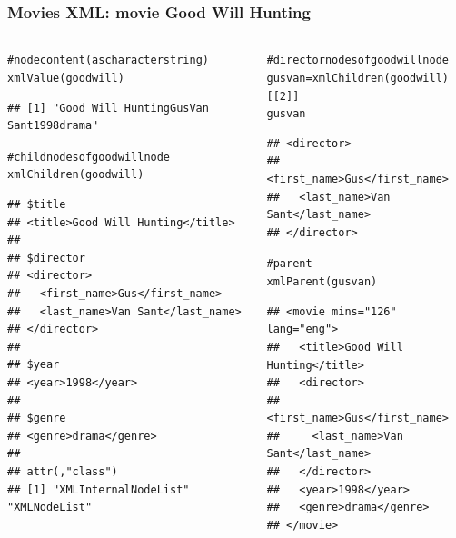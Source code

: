 \documentclass{beamer}\usepackage[]{graphicx}\usepackage[]{color}
\makeatletter
\newcommand{\hlnum}[1]{\textcolor[rgb]{0.063,0.58,0.627}{#1}}%
\newcommand{\hlcom}[1]{\textcolor[rgb]{0.588,0.588,0.588}{#1}}%
\newcommand{\hlstd}[1]{\textcolor[rgb]{0.196,0.196,0.196}{#1}}%
\newcommand{\hlkwb}[1]{\textcolor[rgb]{0.627,0,0.314}{#1}}%
\newcommand{\hlkwd}[1]{\textcolor[rgb]{0.78,0.227,0.412}{#1}}%
\newenvironment{kframe}{%
 \def\at@end@of@kframe{}%
 \ifinner\ifhmode%
  \def\at@end@of@kframe{\end{minipage}}%
  \begin{minipage}{\columnwidth}%
 \fi\fi%
 \def\FrameCommand##1{\hskip\@totalleftmargin \hskip-\fboxsep
 \colorbox{shadecolor}{##1}\hskip-\fboxsep
     \hskip-\linewidth \hskip-\@totalleftmargin \hskip\columnwidth}%
 \MakeFramed {\advance\hsize-\width
   \@totalleftmargin\z@ \linewidth\hsize
   \@setminipage}}%
 {\par\unskip\endMakeFramed%
 \at@end@of@kframe}
\newenvironment{knitrout}{}{} %
\makeatother
\begin{document}
\begin{frame}[fragile]
\frametitle{Movies XML: movie Good Will Hunting}

\begin{columns}[t]
\begin{column}{0.5\textwidth}
\begin{knitrout}\tiny
{}\color{fgcolor}\begin{kframe}
\begin{alltt}
\hlcom{# node content (as character string)}
\hlkwd{xmlValue}\hlstd{(goodwill)}
\end{alltt}
\begin{verbatim}
## [1] "Good Will HuntingGusVan Sant1998drama"
\end{verbatim}
\begin{alltt}
\hlcom{# child nodes of goodwill node}
\hlkwd{xmlChildren}\hlstd{(goodwill)}
\end{alltt}
\begin{verbatim}
## $title
## <title>Good Will Hunting</title> 
## 
## $director
## <director>
##   <first_name>Gus</first_name>
##   <last_name>Van Sant</last_name>
## </director> 
## 
## $year
## <year>1998</year> 
## 
## $genre
## <genre>drama</genre> 
## 
## attr(,"class")
## [1] "XMLInternalNodeList" "XMLNodeList"
\end{verbatim}
\end{kframe}
\end{knitrout}
\end{column}

\begin{column}{0.5\textwidth}
\begin{knitrout}\tiny
{}\color{fgcolor}\begin{kframe}
\begin{alltt}
\hlcom{# director nodes of goodwill node}
\hlstd{gusvan} \hlkwb{=} \hlkwd{xmlChildren}\hlstd{(goodwill)[[}\hlnum{2}\hlstd{]]}
\hlstd{gusvan}
\end{alltt}
\begin{verbatim}
## <director>
##   <first_name>Gus</first_name>
##   <last_name>Van Sant</last_name>
## </director>
\end{verbatim}
\begin{alltt}
\hlcom{# parent}
\hlkwd{xmlParent}\hlstd{(gusvan)}
\end{alltt}
\begin{verbatim}
## <movie mins="126" lang="eng">
##   <title>Good Will Hunting</title>
##   <director>
##     <first_name>Gus</first_name>
##     <last_name>Van Sant</last_name>
##   </director>
##   <year>1998</year>
##   <genre>drama</genre>
## </movie>
\end{verbatim}
\end{kframe}
\end{knitrout}
\end{column}
\end{columns}

\end{frame}
\end{document}
